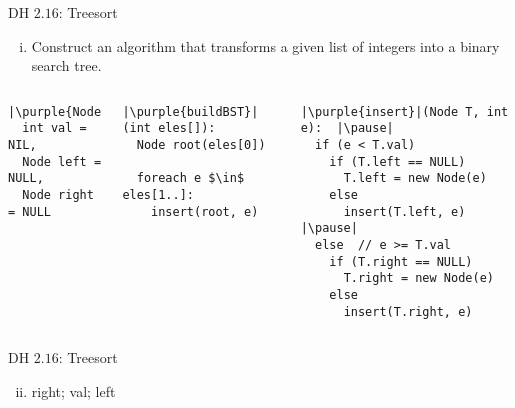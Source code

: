 \begin{frame}[fragile]{}
  \begin{exampleblock}{DH $2.16$: Treesort}
    \begin{enumerate}[(i)]
      \item Construct an algorithm that transforms a given list of integers into a binary search tree.
    \end{enumerate}
  \end{exampleblock}

  \begin{columns}
      \pause
      \begin{lstlisting}[style = Cstyle]
|\purple{Node:}|
  int val = NIL,
  Node left = NULL,
  Node right = NULL
      \end{lstlisting}

      \pause
      \begin{lstlisting}[style = Cstyle]
|\purple{buildBST}|(int eles[]):
  Node root(eles[0])

  foreach e $\in$ eles[1..]:
    insert(root, e)
      \end{lstlisting}
      \pause
      \begin{lstlisting}[style = Cstyle]
|\purple{insert}|(Node T, int e):  |\pause|
  if (e < T.val)
    if (T.left == NULL)
      T.left = new Node(e)
    else
      insert(T.left, e)  |\pause|
  else  // e >= T.val
    if (T.right == NULL)
      T.right = new Node(e)
    else
      insert(T.right, e)
      \end{lstlisting}
  \end{columns}
\end{frame}

\begin{frame}[fragile]{}
  \begin{exampleblock}{DH $2.16$: Treesort}
    \begin{enumerate}[(i)]
      \setcounter{enumi}{1}
      \item right; \quad val; \quad left
    \end{enumerate}
  \end{exampleblock}

  \vspace{0.30cm}
\end{frame}

